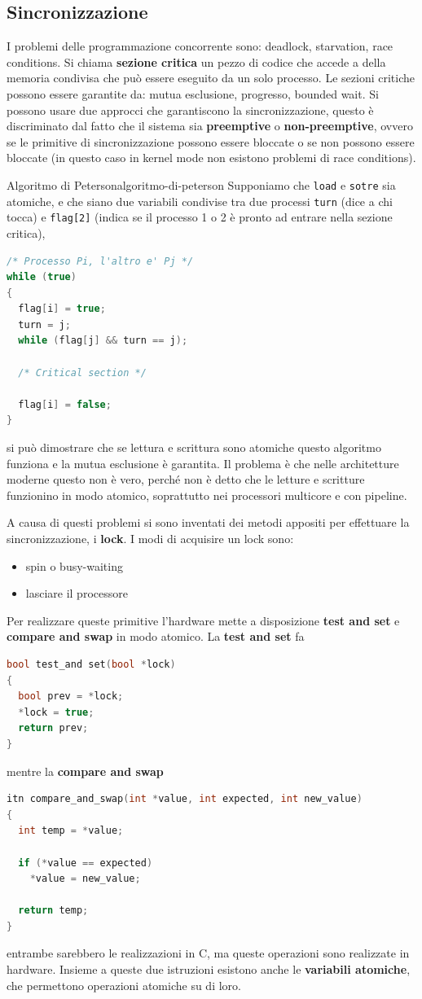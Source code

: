 \documentclass[12pt]{article}
\begin{document}
\subsection{Sincronizzazione}
I problemi delle programmazione concorrente sono: deadlock, starvation, race conditions. Si chiama \textbf{sezione critica} un pezzo di codice che accede a della memoria condivisa che pu\`o essere eseguito da un solo processo. Le sezioni critiche possono essere garantite da: mutua esclusione, progresso, bounded wait. Si possono usare due approcci che garantiscono la sincronizzazione, questo \`e discriminato dal fatto che il sistema sia \textbf{preemptive} o \textbf{non-preemptive}, ovvero se le primitive di sincronizzazione possono essere bloccate o se non possono essere bloccate (in questo caso in kernel mode non esistono problemi di race conditions).
\begin{example}{Algoritmo di Peterson}{algoritmo-di-peterson}
  Supponiamo che \texttt{load} e \texttt{sotre} sia atomiche, e che siano due variabili condivise tra due processi \texttt{turn} (dice a chi tocca) e \texttt{flag[2]} (indica se il processo 1 o 2 \`e pronto ad entrare nella sezione critica),
\begin{lstlisting}[language=c]
/* Processo Pi, l'altro e' Pj */
while (true)
{
  flag[i] = true;
  turn = j;
  while (flag[j] && turn == j);

  /* Critical section */

  flag[i] = false;
}
\end{lstlisting}
  si pu\`o dimostrare che se lettura e scrittura sono atomiche questo algoritmo funziona e la mutua esclusione \`e garantita. Il problema \`e che nelle architetture moderne questo non \`e vero, perch\'e non \`e detto che le letture e scritture funzionino in modo atomico, soprattutto nei processori multicore e con pipeline.
\end{example}
A causa di questi problemi si sono inventati dei metodi appositi per effettuare la sincronizzazione, i \textbf{lock}. I modi di acquisire un lock sono:
\begin{itemize}
  \item spin o busy-waiting
  \item lasciare il processore
\end{itemize}
Per realizzare queste primitive l'hardware mette a disposizione \textbf{test and set} e \textbf{compare and swap} in modo atomico. La \textbf{test and set} fa
\begin{lstlisting}[language=c]
bool test_and set(bool *lock)
{
  bool prev = *lock;
  *lock = true;
  return prev;
}
\end{lstlisting}
mentre la \textbf{compare and swap}
\begin{lstlisting}[language=c]
itn compare_and_swap(int *value, int expected, int new_value)
{
  int temp = *value;

  if (*value == expected)
    *value = new_value;

  return temp;
}
\end{lstlisting}
entrambe sarebbero le realizzazioni in C, ma queste operazioni sono realizzate in hardware. Insieme a queste due istruzioni esistono anche le \textbf{variabili atomiche}, che permettono operazioni atomiche su di loro.
\end{document}
